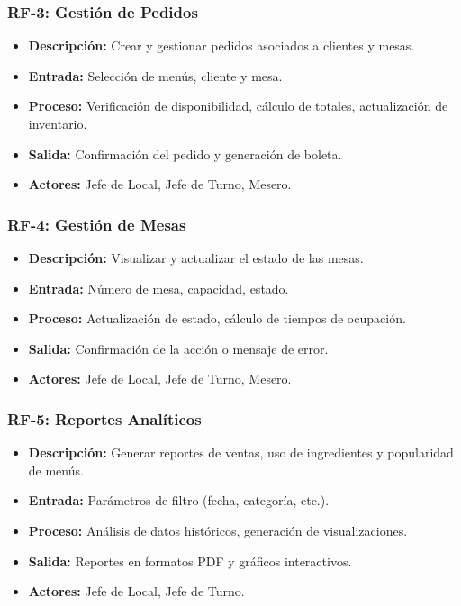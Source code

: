 \documentclass[12pt]{article}
\begin{document}
\subsubsection{RF-3: Gestión de Pedidos}
\begin{itemize}
  \item \textbf{Descripción:} Crear y gestionar pedidos asociados a clientes y mesas.
  \item \textbf{Entrada:} Selección de menús, cliente y mesa.
  \item \textbf{Proceso:} Verificación de disponibilidad, cálculo de totales, actualización de inventario.
  \item \textbf{Salida:} Confirmación del pedido y generación de boleta.
  \item \textbf{Actores:} Jefe de Local, Jefe de Turno, Mesero.
\end{itemize}

\subsubsection{RF-4: Gestión de Mesas}
\begin{itemize}
  \item \textbf{Descripción:} Visualizar y actualizar el estado de las mesas.
  \item \textbf{Entrada:} Número de mesa, capacidad, estado.
  \item \textbf{Proceso:} Actualización de estado, cálculo de tiempos de ocupación.
  \item \textbf{Salida:} Confirmación de la acción o mensaje de error.
  \item \textbf{Actores:} Jefe de Local, Jefe de Turno, Mesero.
\end{itemize}

\subsubsection{RF-5: Reportes Analíticos}
\begin{itemize}
  \item \textbf{Descripción:} Generar reportes de ventas, uso de ingredientes y popularidad de menús.
  \item \textbf{Entrada:} Parámetros de filtro (fecha, categoría, etc.).
  \item \textbf{Proceso:} Análisis de datos históricos, generación de visualizaciones.
  \item \textbf{Salida:} Reportes en formatos PDF y gráficos interactivos.
  \item \textbf{Actores:} Jefe de Local, Jefe de Turno.
\end{itemize}
\end{document}
